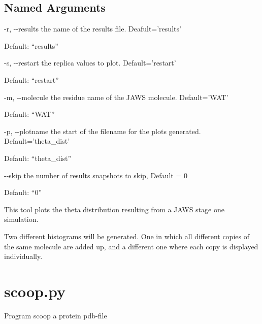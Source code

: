 \documentclass[letterpaper,10pt,english]{sphinxmanual}
\begin{document}
\subsection{Named Arguments}
\label{\detokenize{tools:Named Arguments}}\begin{optionlist}{3cm}
\item [-r, -{-}results]  
the name of the results file. Deafult=’results’

Default: “results”
\item [-s, -{-}restart]  
the replica values to plot. Default=’restart’

Default: “restart”
\item [-m, -{-}molecule]  
the residue name of the JAWS molecule. Default=’WAT’

Default: “WAT”
\item [-p, -{-}plotname]  
the start of the filename for the plots generated. Default=’theta\_dist’

Default: “theta\_dist”
\item [-{-}skip]  
the number of results snapshots to skip, Default = 0

Default: “0”
\end{optionlist}


%
\begin{sphinxVerbatim}[commandchars=\\\{\}]
    
    
\end{sphinxVerbatim}


This tool plots the theta distribution resulting from a JAWS stage one simulation.

Two different histograms will be generated. One in which all different copies of the same molecule are added up, and a different one where each copy is displayed individually.


\section{scoop.py}
\label{\detokenize{tools:scoop-py}}

Program scoop a protein pdb-file
\end{document}
